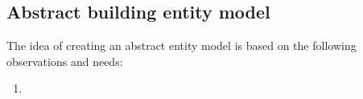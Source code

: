 
\subsection{Abstract building entity model}

The idea of creating an abstract entity model is based on the following observations and needs:
\begin{enumerate}
    \item 
\end{enumerate}